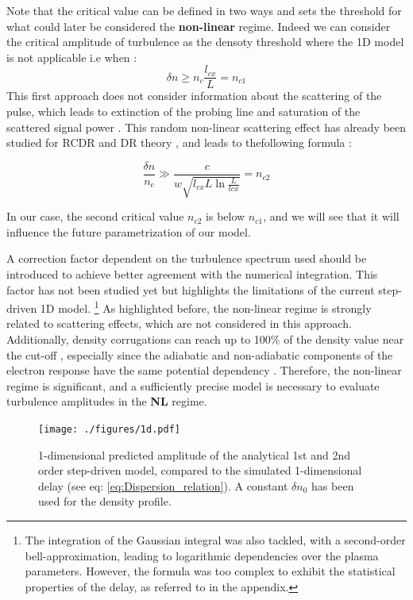 \documentclass[11pt,openany]{report}
\begin{document}
\begin{multicols}{2}
    Note that the critical value can be defined in two ways \cite{SPR_Krutkin} and sets the threshold for what could later be considered the \textbf{non-linear} regime. Indeed we can consider the critical amplitude of turbulence as the densoty threshold where the 1D model is not applicable i.e when : $$\delta n \geq n_c \frac{l_{cx}}{L} = n_{c 1}$$ This first approach does not consider information about the scattering of the pulse, which leads to extinction of the probing line and saturation of the scattered signal power \cite{SPR_Krutkin}. This random non-linear scattering effect has already been studied for RCDR and DR theory \cite{critical2}, and leads to thefollowing formula :

    $$ \frac{\delta n}{n_c} \gg  \frac{c}{w\sqrt{l_{cx}L\ln{\frac{L}{lcx}}}} = n_{c2}$$

    In our case, the second critical value $n_{c 2}$ is below $n_{c 1}$, and we will see that it will influence the future parametrization of our model.

    A correction factor dependent on the turbulence spectrum used should be introduced to achieve better agreement with the numerical integration. This factor has not been studied yet but highlights the limitations of the current step-driven 1D model. \footnote{The integration of the Gaussian integral was also tackled, with a second-order bell-approximation, leading to logarithmic dependencies over the plasma parameters. However, the formula was too complex to exhibit the statistical properties of the delay, as referred to in the appendix.} As highlighted before, the non-linear regime is strongly related to scattering effects, which are not considered in this approach. Additionally, density corrugations can reach up to 100\% of the density value near the cut-off \cite{Krutkin_thesis,San_diego}, especially since the adiabatic and non-adiabatic components of the electron response have the same potential dependency \cite{San_diego}. Therefore, the non-linear regime is significant, and a sufficiently precise model is necessary to evaluate turbulence amplitudes in the \textbf{NL} regime.

    \begin{figure}[H]
        \centering
        \hspace*{-1.4cm}\texttt{[image: ./figures/1d.pdf]}
        \caption{1-dimensional predicted amplitude of the analytical 1st and 2nd order step-driven model, compared to the simulated 1-dimensional delay (see eq: \ref{eq:Dispersion_relation}). A constant \(\delta n_0\) has been used for the density profile.}
        \label{fig:std_delay}
    \end{figure}


\end{multicols}
\end{document}
